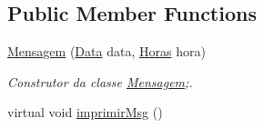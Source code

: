 \subsection*{Public Member Functions}
\begin{DoxyCompactItemize}
\item 
\hyperlink{class_mensagem_a4152f41a1dbfd03eb058d6a9926f4426}{Mensagem} (\hyperlink{class_data}{Data} data, \hyperlink{class_horas}{Horas} hora)
\begin{DoxyCompactList}\small\item\em Construtor da classe \hyperlink{class_mensagem}{Mensagem};. \end{DoxyCompactList}\item 
\hypertarget{class_mensagem_a4490a1cfe88288fa1ff4b41327e769ed}{}virtual void \hyperlink{class_mensagem_a4490a1cfe88288fa1ff4b41327e769ed}{imprimir\+Msg} ()\label{class_mensagem_a4490a1cfe88288fa1ff4b41327e769ed}


\end{DoxyCompactItemize}
